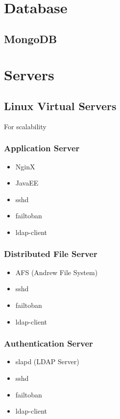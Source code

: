 
\section{Database}
	\subsection{MongoDB}
		
\section{Servers}
	\subsection{Linux Virtual Servers}
		For scalability
		\subsubsection{Application Server}
		\begin{itemize}
			\item NginX
			\item JavaEE
			\item sshd
			\item failtoban
			\item ldap-client
		\end{itemize}
		\subsubsection{Distributed File Server}
		\begin{itemize}
			\item AFS (Andrew File System)
			\item sshd
			\item failtoban
			\item ldap-client
		\end{itemize}
		\subsubsection{Authentication Server}
		\begin{itemize}
			\item slapd (LDAP Server)
			\item sshd
			\item failtoban
			\item ldap-client
		\end{itemize}		
